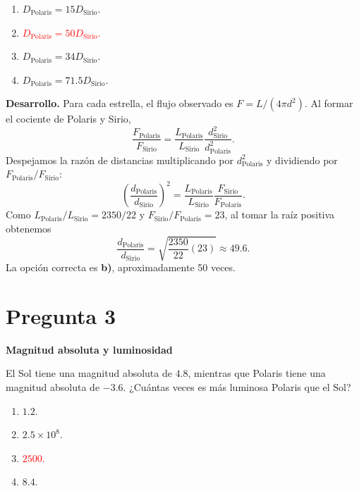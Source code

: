 \documentclass[a4paper,11pt]{article}
\newcommand{\pregunta}[2]{\section*{Pregunta #1}\textbf{#2}\par}
\begin{document}
\begin{enumerate}
    \item $D_{\mathrm{Polaris}}=15D_{\mathrm{Sirio}}$.
    \item \textcolor{red}{$D_{\mathrm{Polaris}}=50D_{\mathrm{Sirio}}$.}
    \item $D_{\mathrm{Polaris}}=34D_{\mathrm{Sirio}}$.
    \item $D_{\mathrm{Polaris}}=71.5D_{\mathrm{Sirio}}$.
\end{enumerate}

\textbf{Desarrollo.} Para cada estrella, el flujo observado es $F=L/(4\pi d^2)$. Al formar el cociente de Polaris y Sirio,
\[
\frac{F_{\mathrm{Polaris}}}{F_{\mathrm{Sirio}}}
=\frac{L_{\mathrm{Polaris}}}{L_{\mathrm{Sirio}}}
\frac{d_{\mathrm{Sirio}}^2}{d_{\mathrm{Polaris}}^2}.
\]
Despejamos la razón de distancias multiplicando por $d_{\mathrm{Polaris}}^2$ y dividiendo por $F_{\mathrm{Polaris}}/F_{\mathrm{Sirio}}$:
\[
\left(\frac{d_{\mathrm{Polaris}}}{d_{\mathrm{Sirio}}}\right)^2
=\frac{L_{\mathrm{Polaris}}}{L_{\mathrm{Sirio}}}
\frac{F_{\mathrm{Sirio}}}{F_{\mathrm{Polaris}}}.
\]
Como $L_{\mathrm{Polaris}}/L_{\mathrm{Sirio}}=2350/22$ y $F_{\mathrm{Sirio}}/F_{\mathrm{Polaris}}=23$, al tomar la raíz positiva obtenemos
\[
\frac{d_{\mathrm{Polaris}}}{d_{\mathrm{Sirio}}}
=\sqrt{\frac{2350}{22}(23)}\approx49.6.
\]
La opción correcta es \textbf{b)}, aproximadamente 50 veces. \parencite[Sec. 7.3.1, p. 233]{chaparro2026}

\pregunta{3}{Magnitud absoluta y luminosidad}

El Sol tiene una magnitud absoluta de $4.8$, mientras que Polaris tiene una magnitud absoluta de $-3.6$. ¿Cuántas veces es más luminosa Polaris que el Sol?

\begin{enumerate}
    \item $1.2$.
    \item $2.5\times10^8$.
    \item \textcolor{red}{$2500$.}
    \item $8.4$.
\end{enumerate}
\end{document}
